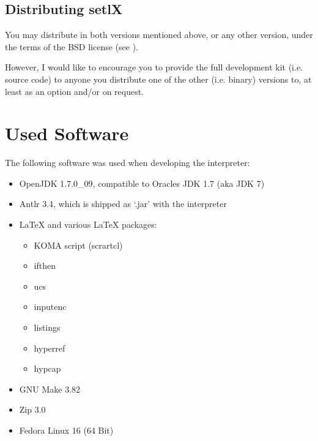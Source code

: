 \subsection{Distributing setlX}

You may distribute \setlX{} in both versions mentioned above, or any other version, under the terms of the BSD license (see ).

However, I would like to encourage you to provide the full development kit (i.e. source code) to anyone you distribute one of the other (i.e. binary) versions to, at least as an option and\slash{}or on request.

\section{Used Software}

The following software was used when developing the \setlX{} interpreter:

\begin{itemize}
	\item OpenJDK 1.7.0\_09, compatible to Oracles JDK 1.7 (aka JDK 7)
	\item Antlr 3.4, which is shipped as `.jar' with the interpreter
	\item \LaTeX{} and various \LaTeX{} packages:
		\begin{itemize}
			\item KOMA script (scrartcl)
			\item ifthen
			\item ucs
			\item inputenc
			\item listings
			\item hyperref
			\item hypcap
		\end{itemize}
	\item GNU Make 3.82
	\item Zip 3.0
	\item Fedora Linux 16 (64 Bit)
\end{itemize}


